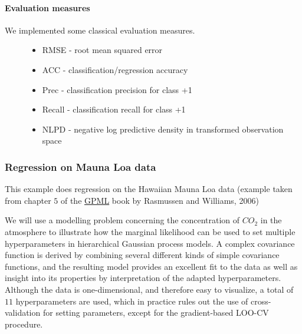 \documentclass[letterpaper,10pt,english]{sphinxmanual}
\begin{document}
\paragraph{Evaluation measures}
\label{CV:evaluation-measures}\begin{description}
\item[{We implemented some classical evaluation measures.}] \leavevmode\begin{itemize}
\item {} 
RMSE - root mean squared error

\item {} 
ACC - classification/regression accuracy

\item {} 
Prec - classification precision for class +1

\item {} 
Recall - classification recall for class +1

\item {} 
NLPD - negative log predictive density in transformed observation space

\end{itemize}

\end{description}


\subsubsection{Regression on Mauna Loa data}
\label{demoMaunaLoa:regression-on-mauna-loa-data}\label{demoMaunaLoa::doc}
This example does regression on the Hawaiian Mauna Loa data (example taken from chapter $5$ of the \href{http://www.gaussianprocess.org/gpml/chapters/RW5.pdf}{GPML} book by Rasmussen and Williams, 2006)

We will use a modelling problem concerning the concentration of $CO_2$
in the atmosphere to illustrate how the marginal likelihood can be used to set multiple
hyperparameters in hierarchical Gaussian process models. A complex covariance function
is derived by combining several different kinds of simple covariance
functions, and the resulting model provides an excellent fit to the data as well
as insight into its properties by interpretation of the adapted hyperparameters. Although the data is
one-dimensional, and therefore easy to visualize, a
total of $11$ hyperparameters are used, which in practice rules out the use of
cross-validation for setting parameters, except for the gradient-based LOO-CV procedure.
\end{document}
